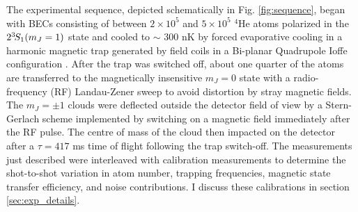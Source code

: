 	The experimental sequence, depicted schematically in Fig. \ref{fig:sequence}, began with BECs consisting of between $2\times 10^5$ and $5\times 10^5$ $^4$He atoms polarized in the $2^{3\!}S_1(m_J=1)$ state and cooled to $\sim$ 300 nK by forced evaporative cooling in a harmonic magnetic trap generated by field coils in a Bi-planar Quadrupole Ioffe configuration \cite{Dall07}. 
	After the trap was switched off,  about one quarter of the atoms are transferred to the magnetically insensitive $m_J=0$ state with a radio-frequency (RF) Landau-Zener sweep to avoid distortion by stray magnetic fields.
	The $m_J=\pm 1$ clouds were deflected outside the detector field of view by a Stern-Gerlach scheme implemented by switching on a magnetic field immediately after the RF pulse.
	The centre of mass of the cloud then impacted on the detector after a $\tau = 417$ ms time of flight following the trap switch-off. 
	The measurements just described were interleaved with calibration measurements to determine the shot-to-shot variation in atom number, trapping frequencies, magnetic state transfer efficiency, and noise contributions. I discuss these calibrations  in section \ref{sec:exp_details}.

	


